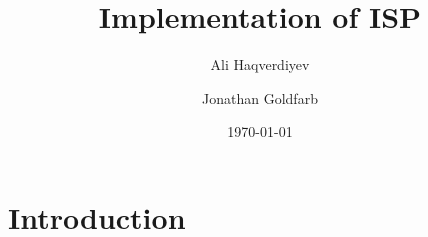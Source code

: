 \documentclass[letterpaper, 10pt]{amsart}
\let\institute\address%
\theoremstyle{definition}
\theoremstyle{remark}
\begin{document}
\title{Implementation of ISP}
\author{Ali Haqverdiyev \and Jonathan Goldfarb}
\institute{Department of Mathematical Sciences\\Florida Institute of
    Technology\\Melbourne, FL 32901}
\date{\today}


\maketitle

\tableofcontents{}

\section{Introduction}\label{sec:introduction}
\end{document}
